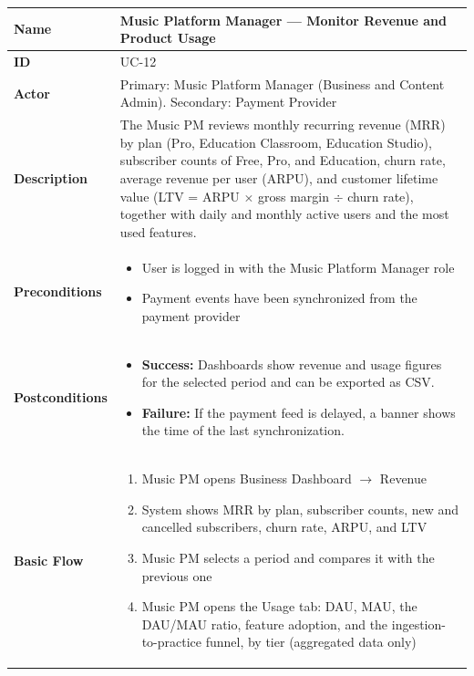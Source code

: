 \documentclass[a4paper]{article}
\newlength{\ucLeft}
\begin{document}
\begin{longtable}{|>{\bfseries}p{\ucLeft}|p{\dimexpr\linewidth-\ucLeft-2\tabcolsep-2\arrayrulewidth}|}
\hline
Name & Music Platform Manager --- Monitor Revenue and Product Usage \\ \hline
ID & UC-12 \\ \hline
Actor & Primary: Music Platform Manager (Business and Content Admin). Secondary: Payment Provider \\ \hline
Description & The Music PM reviews monthly recurring revenue (MRR) by plan (Pro, Education Classroom, Education Studio), subscriber counts of Free, Pro, and Education, churn rate, average revenue per user (ARPU), and customer lifetime value (LTV = ARPU $\times$ gross margin $\div$ churn rate), together with daily and monthly active users and the most used features. \\ \hline
Preconditions &
\begin{itemize}[leftmargin=1em, nosep, topsep=2pt, partopsep=0pt, parsep=0pt, after=\strut]
    \item User is logged in with the Music Platform Manager role
    \item Payment events have been synchronized from the payment provider
\end{itemize}
\\ \hline
Postconditions &
\begin{itemize}[leftmargin=1em, nosep, topsep=2pt, partopsep=0pt, parsep=0pt, after=\strut]
    \item \textbf{Success:} Dashboards show revenue and usage figures for the selected period and can be exported as CSV.
    \item \textbf{Failure:} If the payment feed is delayed, a banner shows the time of the last synchronization.
\end{itemize}
\\ \hline
Basic Flow &
\begin{enumerate}[leftmargin=1.5em, nosep, topsep=2pt, partopsep=0pt, parsep=0pt, after=\strut]
    \item Music PM opens Business Dashboard $\rightarrow$ Revenue
    \item System shows MRR by plan, subscriber counts, new and cancelled subscribers, churn rate, ARPU, and LTV
    \item Music PM selects a period and compares it with the previous one
    \item Music PM opens the Usage tab: DAU, MAU, the DAU/MAU ratio, feature adoption, and the ingestion-to-practice funnel, by tier (aggregated data only)

\end{enumerate}
\end{longtable}
\end{document}
